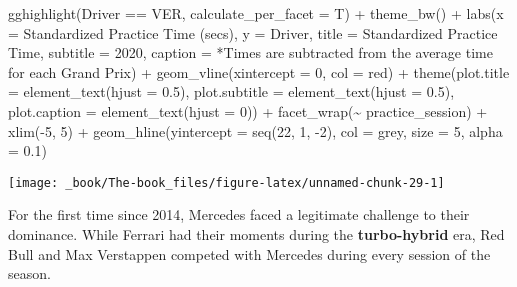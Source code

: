 \documentclass[
]{book}
\newenvironment{Shaded}{\begin{snugshade}}{\end{snugshade}}
\newcommand{\AttributeTok}[1]{\textcolor[rgb]{0.77,0.63,0.00}{#1}}
\newcommand{\DecValTok}[1]{\textcolor[rgb]{0.00,0.00,0.81}{#1}}
\newcommand{\FloatTok}[1]{\textcolor[rgb]{0.00,0.00,0.81}{#1}}
\newcommand{\FunctionTok}[1]{\textcolor[rgb]{0.00,0.00,0.00}{#1}}
\newcommand{\NormalTok}[1]{#1}
\newcommand{\SpecialCharTok}[1]{\textcolor[rgb]{0.00,0.00,0.00}{#1}}
\newcommand{\StringTok}[1]{\textcolor[rgb]{0.31,0.60,0.02}{#1}}
\begin{document}
\begin{Shaded}
\begin{Highlighting}[]
  \FunctionTok{gghighlight}\NormalTok{(Driver }\SpecialCharTok{==} \StringTok{\textquotesingle{}VER\textquotesingle{}}\NormalTok{, }\AttributeTok{calculate\_per\_facet =}\NormalTok{ T) }\SpecialCharTok{+} 
   \FunctionTok{theme\_bw}\NormalTok{() }\SpecialCharTok{+}
   \FunctionTok{labs}\NormalTok{(}\AttributeTok{x =} \StringTok{\textquotesingle{}Standardized Practice Time (secs)\textquotesingle{}}\NormalTok{,}
        \AttributeTok{y =} \StringTok{\textquotesingle{}Driver\textquotesingle{}}\NormalTok{,}
        \AttributeTok{title =} \StringTok{\textquotesingle{}Standardized Practice Time\textquotesingle{}}\NormalTok{,}
        \AttributeTok{subtitle =} \StringTok{\textquotesingle{}2020\textquotesingle{}}\NormalTok{,}
        \AttributeTok{caption =} \StringTok{\textquotesingle{}*Times are subtracted from the average time for each Grand Prix\textquotesingle{}}\NormalTok{) }\SpecialCharTok{+}
   \FunctionTok{geom\_vline}\NormalTok{(}\AttributeTok{xintercept =} \DecValTok{0}\NormalTok{, }\AttributeTok{col =} \StringTok{\textquotesingle{}red\textquotesingle{}}\NormalTok{) }\SpecialCharTok{+}
   \FunctionTok{theme}\NormalTok{(}\AttributeTok{plot.title =} \FunctionTok{element\_text}\NormalTok{(}\AttributeTok{hjust =} \FloatTok{0.5}\NormalTok{),}
         \AttributeTok{plot.subtitle =} \FunctionTok{element\_text}\NormalTok{(}\AttributeTok{hjust =} \FloatTok{0.5}\NormalTok{),}
         \AttributeTok{plot.caption =} \FunctionTok{element\_text}\NormalTok{(}\AttributeTok{hjust =} \DecValTok{0}\NormalTok{)) }\SpecialCharTok{+}
  \FunctionTok{facet\_wrap}\NormalTok{(}\SpecialCharTok{\textasciitilde{}}\NormalTok{ practice\_session) }\SpecialCharTok{+}
  \FunctionTok{xlim}\NormalTok{(}\SpecialCharTok{{-}}\DecValTok{5}\NormalTok{, }\DecValTok{5}\NormalTok{) }\SpecialCharTok{+}
  \FunctionTok{geom\_hline}\NormalTok{(}\AttributeTok{yintercept =} \FunctionTok{seq}\NormalTok{(}\DecValTok{22}\NormalTok{, }\DecValTok{1}\NormalTok{, }\SpecialCharTok{{-}}\DecValTok{2}\NormalTok{), }\AttributeTok{col =} \StringTok{\textquotesingle{}grey\textquotesingle{}}\NormalTok{, }\AttributeTok{size =} \DecValTok{5}\NormalTok{, }\AttributeTok{alpha =}  \FloatTok{0.1}\NormalTok{)}
\end{Highlighting}
\end{Shaded}

\begin{center}\texttt{[image: \_book/The-book\_files/figure-latex/unnamed-chunk-29-1]} \end{center}

For the first time since 2014, Mercedes faced a legitimate challenge to their dominance. While Ferrari had their moments during the \textbf{turbo-hybrid} era, Red Bull and Max Verstappen competed with Mercedes during every session of the season.
\end{document}
